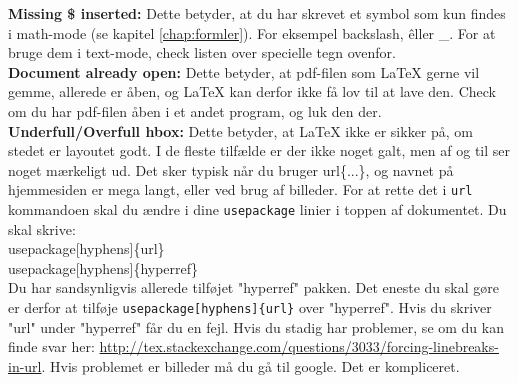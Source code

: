 \noindent
\textbf{Missing \$ inserted:} Dette betyder, at du har skrevet et symbol som kun findes i math-mode (se kapitel \ref{chap:formler}). For eksempel \bs backslash, \^ eller \_. For at bruge dem i text-mode, check listen over specielle tegn ovenfor.\\

\noindent
\textbf{Document already open:} Dette betyder, at pdf-filen som LaTeX gerne vil gemme, allerede er åben, og LaTeX kan derfor ikke få lov til at lave den. Check om du har pdf-filen åben i et andet program, og luk den der.\\

\noindent
\textbf{Underfull/Overfull \bs hbox:} Dette betyder, at LaTeX ikke er sikker på, om stedet er layoutet godt. I de fleste tilfælde er der ikke noget galt, men af og til ser noget mærkeligt ud. Det sker typisk når du bruger \bs url\{...\}, og navnet på hjemmesiden er mega langt, eller ved brug af billeder. For at rette det i \texttt{\bs url} kommandoen skal du ændre i dine \texttt{\bs usepackage} linier i toppen af dokumentet. Du skal skrive:\\

\indent \bs usepackage[hyphens]\{url\}\\
\indent \bs usepackage[hyphens]\{hyperref\}\\

\noindent
Du har sandsynligvis allerede tilføjet "hyperref" pakken. Det eneste du skal gøre er derfor at tilføje \texttt{\bs usepackage[hyphens]\{url\}} over "hyperref". Hvis du skriver "url" under "hyperref" får du en fejl. Hvis du stadig har problemer, se om du kan finde svar her: \url{http://tex.stackexchange.com/questions/3033/forcing-linebreaks-in-url}. Hvis problemet er billeder må du gå til google. Det er kompliceret.